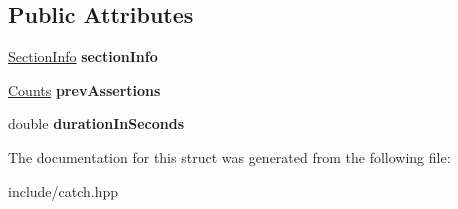 \subsection*{Public Attributes}
\begin{DoxyCompactItemize}
\item 
\hyperlink{structCatch_1_1SectionInfo}{Section\+Info} {\bfseries section\+Info}\hypertarget{structCatch_1_1SectionEndInfo_a2d44793392cb83735d086d726822abe9}{}\label{structCatch_1_1SectionEndInfo_a2d44793392cb83735d086d726822abe9}

\item 
\hyperlink{structCatch_1_1Counts}{Counts} {\bfseries prev\+Assertions}\hypertarget{structCatch_1_1SectionEndInfo_ae70b154cbc05b5dd2901d97f89303d8c}{}\label{structCatch_1_1SectionEndInfo_ae70b154cbc05b5dd2901d97f89303d8c}

\item 
double {\bfseries duration\+In\+Seconds}\hypertarget{structCatch_1_1SectionEndInfo_a7c262f2dab9cff166b8eca620c47eea5}{}\label{structCatch_1_1SectionEndInfo_a7c262f2dab9cff166b8eca620c47eea5}

\end{DoxyCompactItemize}


The documentation for this struct was generated from the following file\+:\begin{DoxyCompactItemize}
\item 
include/catch.\+hpp\end{DoxyCompactItemize}

